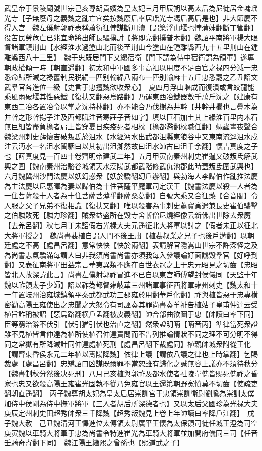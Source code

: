 武皇帝于景陵廟號世宗己亥尊胡貴嬪為皇太妃三月甲辰朔以高太后為尼徙居金墉瑶光寺【子無廢母之義魏之亂亡宜矣按魏廢后率居瑶光寺馮后高后是也】非大節慶不得入宫　魏左僕射郭祚表稱蕭衍狂悖謀斷川瀆【謂築浮山堰也悖蒲妹翻斷丁管翻】役苦民勞危亡已兆宜命將出師長驅撲討【將即亮翻撲普木翻】魏詔平南將軍楊大眼督諸軍鎮荆山【水經淮水過塗山北而後至荆山今塗山在鍾離縣西九十五里荆山在鍾離縣西八十三里】　魏于忠既居門下又總宿衛【門下謂為侍中宿衛謂為領軍】遂專朝政權傾一時【朝直遥翻】初太和中軍國多事高祖以用度不足百官之禄四分減一忠悉命歸所減之禄舊制民税絹一匹别輸綿八兩布一匹别輸麻十五斤忠悉罷之乙丑詔文武羣官各進位一級【史言于忠擅魏欲收衆心】　夏四月浮山堰成而復潰或言蛟龍能乘風雨破堰其性惡鐵【復扶又翻惡烏路翻】乃運東西冶鐵器數千萬斤沈之【建康有東西二冶各置冶令以掌之沈持林翻】亦不能合乃伐樹為井幹【井幹井欄也言疊木為井幹之形幹揚子注及西都賦注音寒莊子音如字】填以巨石加土其上緣淮百里内木石無巨細皆盡負檐者肩上皆穿夏日疾疫死者相枕【檐都濫翻枕職任翻】蠅蟲晝夜聲合　魏梁州刺史薛懷吉破叛氐於沮水【水經沔水出武都沮縣東狼谷中又東南流逕沮水戍注云沔水一名沮水闞駰曰以其初出沮洳然故曰沮水師古曰沮千余翻】懷吉真度之子也【薛真度見一百四十卷齊明帝建武二年】五月甲寅南秦州刺史崔暹又破叛氐解武興之圍【魏南秦州治駱谷城領天水漢陽武都武階修武仇池郡此時蓋叛氐圍武興也】　六月魏冀州沙門法慶以妖幻惑衆【妖於驕翻幻戶辦翻】與勃海人李歸伯作亂推法慶為主法慶以尼惠暉為妻以歸伯為十住菩薩平魔軍司定漢王【魏書法慶以殺一人者為一住菩薩殺十人者為十住菩薩菩薄乎翻薩桑葛翻】自號大乘又合狂藥【合音閤】令人服之父子兄弟不復相識【復扶又翻】唯以殺害為事刺史蕭寶寅遣兼長史崔伯驎擊之伯驎敗死【驎力珍翻】賊衆益盛所在毁寺舍斬僧尼燒經像云新佛出世除去衆魔【去羌呂翻】秋七月丁未詔假右光禄大夫元遥征北大將軍以討之【假者未正以征北大將軍授之】　魏尚書裴植自謂人門不後王肅【植裴叔業之兄子也後戶遘翻】以朝廷處之不高【處昌呂翻】意常怏怏【怏於兩翻】表請解官隱嵩山世宗不許深怪之及為尚書志氣驕滿每謂人曰非我須尚書尚書亦須我每入參議論好面譏毁羣官【好呼到翻】又表征南將軍田益宗言華夷異類不應在百世衣冠之上于忠元昭見之切齒【忠昭皆北人故深諱此言】尚書左僕射郭祚冒進不已自以東宫師傅望封侯儀同【天監十年魏以祚領太子少師】詔以祚為都督雍岐華三州諸軍事征西將軍雍州刺史【魏太和十一年置岐州治雍城鎮領平秦武都武功三郡雍於用翻華戶化翻】祚與植皆惡于忠專横密勸高陽王雍使出之忠聞之大怒令有司誣奏其罪尚書奏羊祉告植姑子皇甫仲達云受植旨詐稱被詔【惡烏路翻横戶孟翻被皮義翻】帥合部曲欲圖于忠【帥讀曰率下同】臣等窮治辭不伏引【伏引猶引伏也治直之翻】然衆證明昞【昞音丙】準律當死衆證雖不見植皆言仲達為植所使植召仲達責問而不告列推論情狀不同之理不可分明不得同之常獄有所降減計同仲達處植死刑【處昌呂翻下裁處同】植親帥城衆附從王化【謂齊東昏侯永元二年植以夀陽降魏】依律上議【謂依八議之律也上時掌翻】乞賜裁處【處昌呂翻】忠矯詔曰凶謀既爾罪不當恕雖有歸化之誠無容上議亦不須待秋分【魏書制秋分然後决死刑】八月己亥植與郭祚及都水使者社陵韋儁皆賜死儁祚之昏家也忠又欲殺高陽王雍崔光固執不從乃免雍官以王還第朝野寃憤莫不切齒【使疏吏翻朝直遥翻】　丙子魏尊胡太妃為皇太后居崇訓宫于忠領崇訓衛尉劉騰為崇訓太僕加侍中侯剛為侍中撫軍將軍【三人者胡后所深德者也】又以太后父國珍為光禄大夫　庚辰定州刺史田超秀帥衆三千降魏【超秀叛魏見上卷上年帥讀曰率降戶江翻】　戊子魏大赦　己丑魏清河王懌進位太傅領太尉廣平王懷為太保領司徒任城王澄為司空庚寅魏以車騎大將軍于忠為尚書令特進崔光為車騎大將軍並加開府儀同三司【任音壬騎奇寄翻下同】　魏江陽王繼熙之曾孫也【熙道武之子】